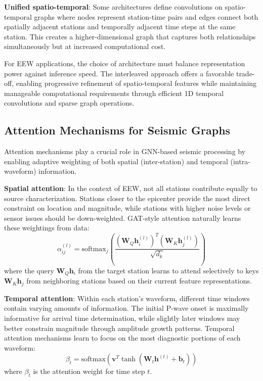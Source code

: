 \documentclass[review,authoryear]{elsarticle}
\begin{document}
\textbf{Unified spatio-temporal}: Some architectures define convolutions on spatio-temporal graphs where nodes represent station-time pairs and edges connect both spatially adjacent stations and temporally adjacent time steps at the same station. This creates a higher-dimensional graph that captures both relationships simultaneously but at increased computational cost.

For EEW applications, the choice of architecture must balance representation power against inference speed. The interleaved approach offers a favorable trade-off, enabling progressive refinement of spatio-temporal features while maintaining manageable computational requirements through efficient 1D temporal convolutions and sparse graph operations.

\subsection{Attention Mechanisms for Seismic Graphs}

Attention mechanisms \citep{bahdanau2015neural} play a crucial role in GNN-based seismic processing by enabling adaptive weighting of both spatial (inter-station) and temporal (intra-waveform) information.

\textbf{Spatial attention}: In the context of EEW, not all stations contribute equally to source characterization. Stations closer to the epicenter provide the most direct constraint on location and magnitude, while stations with higher noise levels or sensor issues should be down-weighted. GAT-style attention \citep{velickovic2018graph} naturally learns these weightings from data:
\begin{equation}
\alpha_{ij}^{(l)} = \text{softmax}_j\left(\frac{(\mathbf{W}_Q\mathbf{h}_i^{(l)})^T (\mathbf{W}_K\mathbf{h}_j^{(l)})}{\sqrt{d_k}}\right)
\end{equation}
where the query $\mathbf{W}_Q\mathbf{h}_i$ from the target station learns to attend selectively to keys $\mathbf{W}_K\mathbf{h}_j$ from neighboring stations based on their current feature representations.

\textbf{Temporal attention}: Within each station's waveform, different time windows contain varying amounts of information. The initial P-wave onset is maximally informative for arrival time determination, while slightly later windows may better constrain magnitude through amplitude growth patterns. Temporal attention mechanisms \citep{guo2019attention} learn to focus on the most diagnostic portions of each waveform:
\begin{equation}
\beta_t = \text{softmax}\left(\mathbf{v}^T \tanh(\mathbf{W}_t\mathbf{h}^{(t)} + \mathbf{b}_t)\right)
\end{equation}
where $\beta_t$ is the attention weight for time step $t$.
\end{document}
